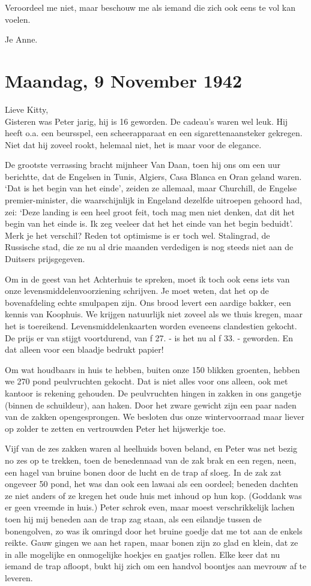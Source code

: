 \documentclass{book}
\begin{document}
Veroordeel me niet, maar beschouw me als iemand die zich ook eens te vol kan
voelen.

Je Anne.

\section*{Maandag, 9 November 1942}

Lieve Kitty,\\
Gisteren was Peter jarig, hij is 16 geworden. De cadeau's waren
wel leuk. Hij heeft o.a. een beursspel, een scheerapparaat en een
sigarettenaansteker gekregen. Niet dat hij zoveel rookt, helemaal niet, het is
maar voor de elegance.

De grootste verrassing bracht mijnheer Van Daan, toen hij ons om een uur
berichtte, dat de Engelsen in Tunis, Algiers, Casa Blanca en Oran geland waren.
`Dat is het begin van het einde', zeiden ze allemaal, maar Churchill, de Engelse
premier-minister, die waarschijnlijk in Engeland dezelfde uitroepen gehoord had,
zei: `Deze landing is een heel groot feit, toch mag men niet denken, dat dit het
begin van het einde is. Ik zeg veeleer dat het het einde van het begin beduidt'.
Merk je het verschil? Reden tot optimisme is er toch wel. Stalingrad, de
Russische stad, die ze nu al drie maanden verdedigen is nog steeds niet aan de
Duitsers prijsgegeven.

Om in de geest van het Achterhuis te spreken, moet ik toch ook eens iets van
onze levensmiddelenvoorziening schrijven. Je moet weten, dat het op de
bovenafdeling echte smulpapen zijn. Ons brood levert een aardige bakker, een
kennis van Koophuis. We krijgen natuurlijk niet zoveel als we thuis kregen, maar
het is toereikend. Levensmiddelenkaarten worden eveneens clandestien gekocht. De
prijs er van stijgt voortdurend, van ƒ 27. - is het nu al ƒ 33. - geworden. En
dat alleen voor een blaadje bedrukt papier!

Om wat houdbaars in huis te hebben, buiten onze 150 blikken groenten, hebben we
270 pond peulvruchten gekocht. Dat is niet alles voor ons alleen, ook met
kantoor is rekening gehouden. De peulvruchten hingen in zakken in ons gangetje
(binnen de schuildeur), aan haken. Door het zware gewicht zijn een paar naden
van de zakken opengesprongen. We besloten dus onze wintervoorraad maar liever op
zolder te zetten en vertrouwden Peter het hijswerkje toe.

Vijf van de zes zakken waren al heelhuids boven beland, en Peter was net bezig
no zes op te trekken, toen de benedennaad van de zak brak en een regen, neen,
een hagel van bruine bonen door de lucht en de trap af sloeg. In de zak zat
ongeveer 50 pond, het was dan ook een lawaai als een oordeel; beneden dachten ze
niet anders of ze kregen het oude huis met inhoud op hun kop. (Goddank was er
geen vreemde in huis.) Peter schrok even, maar moest verschrikkelijk lachen toen
hij mij beneden aan de trap zag staan, als een eilandje tussen de bonengolven,
zo was ik omringd door het bruine goedje dat me tot aan de enkels reikte. Gauw
gingen we aan het rapen, maar bonen zijn zo glad en klein, dat ze in alle
mogelijke en onmogelijke hoekjes en gaatjes rollen. Elke keer dat nu iemand de
trap afloopt, bukt hij zich om een handvol boontjes aan mevrouw af te leveren.
\end{document}
